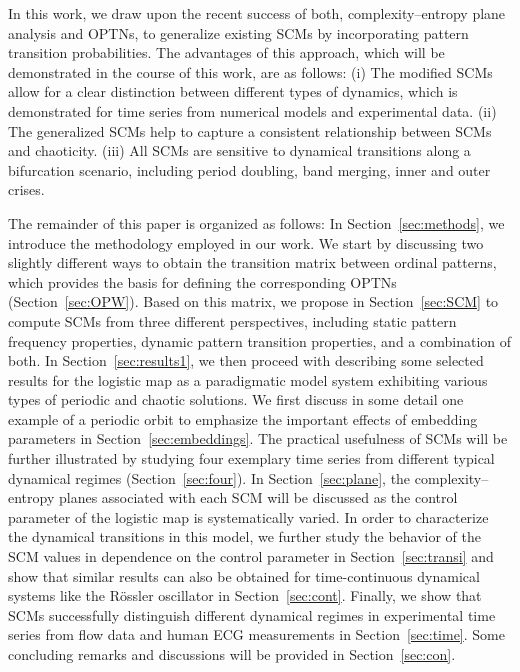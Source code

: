 \documentclass[12pt,aip,cha,reprint,nofootinbib]{revtex4-1}
\begin{document}
In this work, we draw upon the recent success of both, complexity--entropy plane analysis and OPTNs, to generalize  existing SCMs by incorporating pattern transition probabilities. The advantages of this approach, which will be demonstrated in the course of this work, are as follows: (i) The modified SCMs allow for a clear distinction between different types of dynamics, which is demonstrated for time series from numerical models and experimental data. (ii) The generalized SCMs help to capture a consistent relationship between SCMs and chaoticity. (iii) All SCMs are sensitive to dynamical transitions along a bifurcation scenario, including period doubling, band merging, inner and outer crises. 

The remainder of this paper is organized as follows: In Section~\ref{sec:methods}, we introduce the methodology employed in our work. We start by discussing two slightly different ways to obtain the transition matrix between ordinal patterns, which provides the basis for defining the corresponding OPTNs (Section~\ref{sec:OPW}). Based on this matrix, we propose in Section~\ref{sec:SCM} to compute SCMs from three different perspectives, including static pattern frequency properties, dynamic pattern transition properties, and a combination of both. In Section~\ref{sec:results1}, we then proceed with describing some selected results for the logistic map as a paradigmatic model system exhibiting various types of periodic and chaotic solutions. We first discuss in some detail one example of a periodic orbit to emphasize the important effects of embedding parameters in Section~\ref{sec:embeddings}. The practical usefulness of SCMs will be further illustrated by studying four exemplary time series from different typical dynamical regimes (Section~\ref{sec:four}). In Section~\ref{sec:plane}, the complexity--entropy planes associated with each SCM will be discussed as the control parameter of the logistic map is systematically varied. In order to characterize the dynamical transitions in this model, we further study the behavior of the SCM values in dependence on the control parameter in Section~\ref{sec:transi} and show that similar results can also be obtained for time-continuous dynamical systems like the R\"ossler oscillator in Section~\ref{sec:cont}. Finally, we show that SCMs successfully distinguish different dynamical regimes in experimental time series from flow data and human ECG measurements in Section~\ref{sec:time}. Some concluding remarks and discussions will be provided in Section~\ref{sec:con}.  
\end{document}
